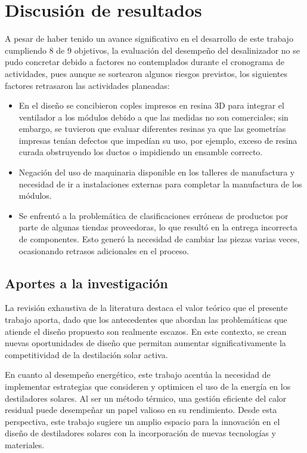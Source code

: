 \chapter{Discusión de resultados}

	A pesar de haber tenido un avance significativo en el desarrollo de este trabajo cumpliendo 8 de 9 objetivos, la evaluación del desempeño del desalinizador no se pudo concretar debido a factores no contemplados durante el cronograma de actividades, pues aunque se sortearon algunos riesgos previstos, los siguientes factores retrasaron las actividades planeadas:
	
	\begin{itemize}
		\item En el diseño se concibieron coples impresos en resina 3D para integrar el ventilador a los módulos debido a que las medidas no son comerciales; sin embargo, se tuvieron que evaluar diferentes resinas ya que las geometrías impresas tenían defectos que impedían su uso, por ejemplo, exceso de resina curada obstruyendo los ductos o impidiendo un ensamble correcto.
		\item Negación del uso de maquinaria disponible en los talleres de manufactura y necesidad de ir a instalaciones externas para completar la manufactura de los módulos.
		\item Se enfrentó a la problemática de clasificaciones erróneas de productos por parte de algunas tiendas proveedoras, lo que resultó en la entrega incorrecta de componentes. Esto generó la necesidad de cambiar las piezas varias veces, ocasionando retrasos adicionales en el proceso.
	\end{itemize}
	
	\section{Aportes a la investigación}
	
		La revisión exhaustiva de la literatura destaca el valor teórico que el presente trabajo aporta, dado que los antecedentes que abordan las problemáticas que atiende el diseño propuesto son realmente escazos. En este contexto, se crean nuevas oportunidades de diseño que permitan aumentar significativamente la competitividad de la destilación solar activa.
		
		En cuanto al desempeño energético, este trabajo acentúa la necesidad de implementar estrategias que consideren y optimicen el uso de la energía en los destiladores solares. Al ser un método térmico, una gestión eficiente del calor residual puede desempeñar un papel valioso en su rendimiento. Desde esta perspectiva, este trabajo sugiere un amplio espacio para la innovación en el diseño de destiladores solares con la incorporación de nuevas tecnologías y materiales. 
		
